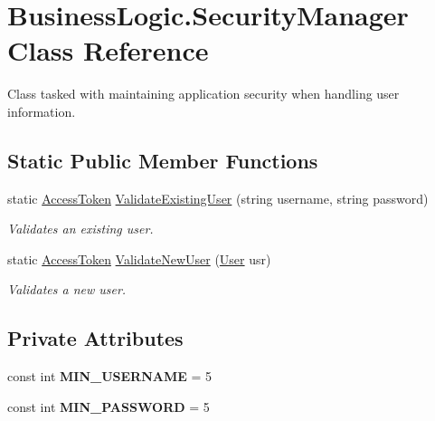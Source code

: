 \hypertarget{class_business_logic_1_1_security_manager}{}\section{Business\+Logic.\+Security\+Manager Class Reference}
\label{class_business_logic_1_1_security_manager}


Class tasked with maintaining application security when handling user information.  


\subsection*{Static Public Member Functions}
\begin{DoxyCompactItemize}
\item 
static \hyperlink{class_business_objects_1_1_access_token}{Access\+Token} \hyperlink{class_business_logic_1_1_security_manager_a27a0b4ffd4af28d8ccdf5751b2bc0445}{Validate\+Existing\+User} (string username, string password)
\begin{DoxyCompactList}\small\item\em Validates an existing user. \end{DoxyCompactList}\item 
static \hyperlink{class_business_objects_1_1_access_token}{Access\+Token} \hyperlink{class_business_logic_1_1_security_manager_a88cf89e8c9ad9e7b34a8e7525fcf5f84}{Validate\+New\+User} (\hyperlink{class_business_objects_1_1_user}{User} usr)
\begin{DoxyCompactList}\small\item\em Validates a new user. \end{DoxyCompactList}\end{DoxyCompactItemize}
\subsection*{Private Attributes}
\begin{DoxyCompactItemize}
\item 
const int {\bfseries M\+I\+N\+\_\+\+U\+S\+E\+R\+N\+A\+ME} = 5\hypertarget{class_business_logic_1_1_security_manager_ae23ca68a4b39e825dd84c625507c3bab}{}\label{class_business_logic_1_1_security_manager_ae23ca68a4b39e825dd84c625507c3bab}

\item 
const int {\bfseries M\+I\+N\+\_\+\+P\+A\+S\+S\+W\+O\+RD} = 5\hypertarget{class_business_logic_1_1_security_manager_a5e99763198398db090c6211c5158acd4}{}\label{class_business_logic_1_1_security_manager_a5e99763198398db090c6211c5158acd4}

\end{DoxyCompactItemize}


